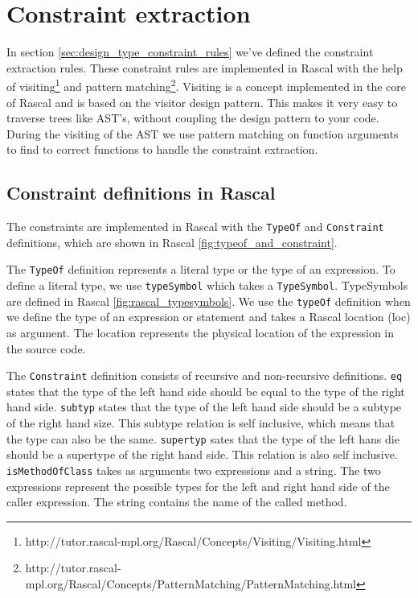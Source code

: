 \documentclass[../main.tex]{subfiles}
\begin{document}
    \section{Constraint extraction}\label{sec:implementation:constraint_extraction}
    In section \ref{sec:design_type_constraint_rules} we've defined the constraint extraction rules.
    These constraint rules are implemented in Rascal with the help of visiting\footnote{http://tutor.rascal-mpl.org/Rascal/Concepts/Visiting/Visiting.html} and pattern matching\footnote{http://tutor.rascal-mpl.org/Rascal/Concepts/PatternMatching/PatternMatching.html}.
    Visiting is a concept implemented in the core of Rascal and is based on the visitor design pattern.
    This makes it very easy to traverse trees like AST's, without coupling the design pattern to your code.
    During the visiting of the AST we use pattern matching on function arguments to find to correct functions to handle the constraint extraction. 

    \subsection{Constraint definitions in Rascal}
    The constraints are implemented in Rascal with the \texttt{TypeOf} and \texttt{Constraint} definitions, which are shown in Rascal \ref{fig:typeof_and_constraint}.
    
    The \texttt{TypeOf} definition represents a literal type or the type of an expression.
    To define a literal type, we use \texttt{typeSymbol} which takes a \texttt{TypeSymbol}.
    TypeSymbols are defined in Rascal \ref{fig:rascal_typesymbols}.
    We use the \texttt{typeOf} definition when we define the type of an expression or statement and takes a Rascal location (loc) as argument.
    The location represents the physical location of the expression in the source code.
    
    The \texttt{Constraint} definition consists of recursive and non-recursive definitions.
    \texttt{eq} states that the type of the left hand side should be equal to the type of the right hand side.
    \texttt{subtyp} states that the type of the left hand side should be a subtype of the right hand size.
    This subtype relation is self inclusive, which means that the type can also be the same.
    \texttt{supertyp} sates that the type of the left hans die should be a supertype of the right hand side.
    This relation is also self inclusive.
    \texttt{isMethodOfClass} takes as arguments two expressions and a string.
    The two expressions represent the possible types for the left and right hand side of the caller expression.
    The string contains the name of the called method.
    
\end{document}
